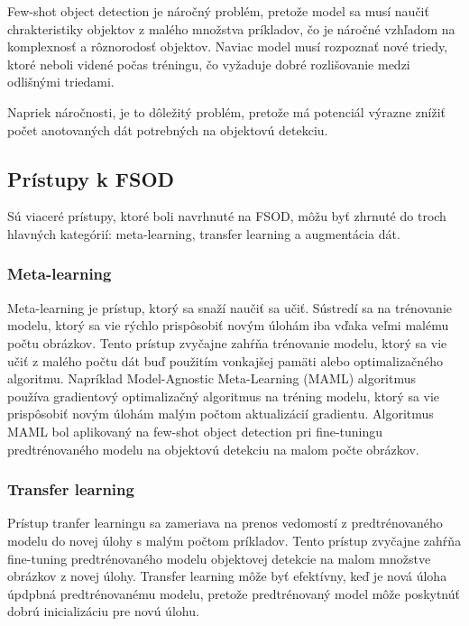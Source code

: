 Few-shot object detection je náročný problém, pretože model sa musí naučiť chrakteristiky objektov z malého množstva príkladov, čo je náročné vzhľadom na komplexnosť a rôznorodosť objektov. Naviac model musí rozpoznať nové triedy, ktoré neboli videné počas tréningu, čo vyžaduje dobré rozlišovanie medzi odlišnými triedami. 

Napriek náročnosti, je to dôležitý problém, pretože má potenciál výrazne znížiť počet anotovaných dát potrebných na objektovú detekciu. 


\subsection{Prístupy k FSOD}
\hspace{\parindent}Sú viaceré prístupy, ktoré boli navrhnuté na FSOD, môžu byť zhrnuté do troch hlavných kategórií: meta-learning, transfer learning a augmentácia dát.

\subsubsection{Meta-learning}
\hspace{\parindent}Meta-learning je prístup, ktorý sa snaží naučiť sa učiť. Sústredí sa na trénovanie modelu, ktorý sa vie rýchlo prispôsobiť novým úlohám iba vďaka veľmi malému počtu obrázkov. Tento prístup zvyčajne zahŕňa trénovanie modelu, ktorý sa vie učiť z malého počtu dát buď použitím vonkajšej pamäti alebo optimalizačného algoritmu. Napríklad Model-Agnostic Meta-Learning (MAML) algoritmus používa gradientový optimalizačný algoritmus na tréning modelu, ktorý sa vie prispôsobiť novým úlohám malým počtom aktualizácií gradientu. Algoritmus MAML bol aplikovaný na few-shot object detection pri fine-tuningu predtrénovaného modelu na objektovú detekciu na malom počte obrázkov.
\cite{finn2017model}

\subsubsection{Transfer learning}
\hspace{\parindent}Prístup tranfer learningu sa zameriava na prenos vedomostí z predtrénovaného modelu do novej úlohy s malým počtom príkladov. Tento prístup zvyčajne zahŕňa fine-tuning predtrénovaného modelu objektovej detekcie na malom množstve obrázkov z novej úlohy. Transfer learning môže byť efektívny, keď je nová úloha úpdpbná predtrénovanému modelu, pretože predtrénovaný model môže poskytnúť dobrú inicializáciu pre novú úlohu. 

